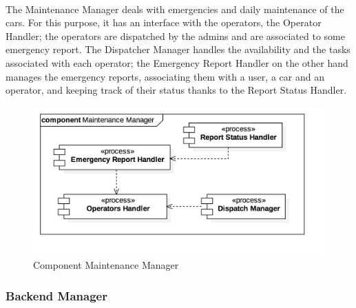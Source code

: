 		\paragraph{} The Maintenance Manager deals with emergencies and daily maintenance of the cars. For this purpose, it has an interface with the operators, the Operator Handler; the operators are dispatched by the admins and are associated to some emergency report. The Dispatcher Manager handles the availability and the tasks associated with each operator; the Emergency Report Handler on the other hand manages the emergency reports, associating them with a user, a car and an operator, and keeping track of their status thanks to the Report Status Handler.
		\begin{figure}[h]
			\includegraphics[scale=0.4, center]{img/component_diagrams/06_maintenance_manager.png}
			\caption{Component Maintenance Manager}
		\end{figure}	
		

\FloatBarrier		
		
		
		
		\subsubsection*{Backend Manager}
			
			
